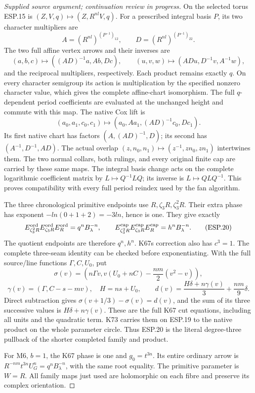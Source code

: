 \begin{proof}[Supplied source argument; continuation review in progress]
On the selected torus ESP.15 is
\((Z,V,q)\mapsto(Z,R^{nl}V,q)\). For a prescribed integral basis
\(P\), its two character multipliers are
\[
 A=(R^{nl})^{(P^{-1})_{12}},\qquad
 D=(R^{nl})^{(P^{-1})_{22}}.
 \tag{ESP.17}
\]
The two full affine vertex arrows and their inverses are
\[
 (a,b,c)\mapsto((AD)^{-1}a,Ab,Dc),\qquad
 (u,v,w)\mapsto(ADu,D^{-1}v,A^{-1}w),
 \tag{ESP.18}
\]
and the reciprocal multipliers, respectively. Each product remains
exactly \(q\). On every character semigroup its action is multiplication
by the specified nonzero character value, which gives the complete
affine-chart isomorphism. The full \(q\)-dependent period coefficients
are evaluated at the unchanged height and commute with this map.
The native Cox lift is
\[
 (a_0,a_1,c_0,c_1)\mapsto
          (a_0,Aa_1,(AD)^{-1}c_0,Dc_1).
 \tag{ESP.19}
\]
Its first native chart has factors \((A,(AD)^{-1},D)\); its second
has \((A^{-1},D^{-1},AD)\). The actual overlap
\((z,n_0,n_1)\mapsto(z^{-1},zn_0,zn_1)\) intertwines them.
The two normal collars, both rulings, and every original finite cap
are carried by these same maps. The integral basis change acts on
the complete logarithmic coefficient matrix by \(L\mapsto Q^{-1}LQ\);
its inverse is \(L\mapsto QLQ^{-1}\). This proves compatibility
with every full period reindex used by the fan algorithm.

The three chronological primitive endpoints use
\(R,\zeta_3R,\zeta_3^2R\). Their extra phase has exponent
\(-ln(0+1+2)=-3ln\), hence is one. They give exactly
\[
 E_{\zeta_3^2R}^{\rm ord}E_{\zeta_3R}^{\rm ord}E_R^{\rm ord}
       =q^nB_\lambda^{-n},\qquad
 E_{\zeta_3^2R}^{\rm cap}E_{\zeta_3R}^{\rm cap}E_R^{\rm cap}
       =h^nB_\lambda^{-n}.
 \tag{ESP.20}
\]
The quotient endpoints are therefore \(q^n,h^n\). K67\textquotesingle s correction
also has \(c^3=1\). The complete three-seam identity can be checked
before exponentiating. With the full source/line functions
\(\Gamma,C,U_0\), put
\[
 \sigma(v)=\left(n\Gamma v,
 v(U_0+nC)-\frac{nm}{2}(v^2-v)\right),
\]
\[
 \gamma(v)=(\Gamma,C-s-mv),\quad H=ns+U_0,
 \qquad d(v)=\frac{H\delta+n\gamma(v)}3+\frac{nm}{9}\delta.
 \tag{ESP.21}
\]
Direct subtraction gives \(\sigma(v+1/3)-\sigma(v)=d(v)\), and
the sum of its three successive values is \(H\delta+n\gamma(v)\).
These are the full K67 cut equations, including all units and the
quadratic term. K73 carries them on ESP.19 to the native product on
the whole parameter circle. Thus ESP.20 is the literal degree-three
pullback of the shorter completed family and product.

For M6, \(b=1\), the K67 phase is one and \(g_0=t^{3n}\).
Its entire ordinary arrow is
\(R^{-nm}t^{3n}U_G^n=q^nB_\lambda^{-n}\), with the same
root equality. The primitive parameter is \(W=R\). All family maps
just used are holomorphic on each fibre and preserve its complex
orientation.


\end{proof}
